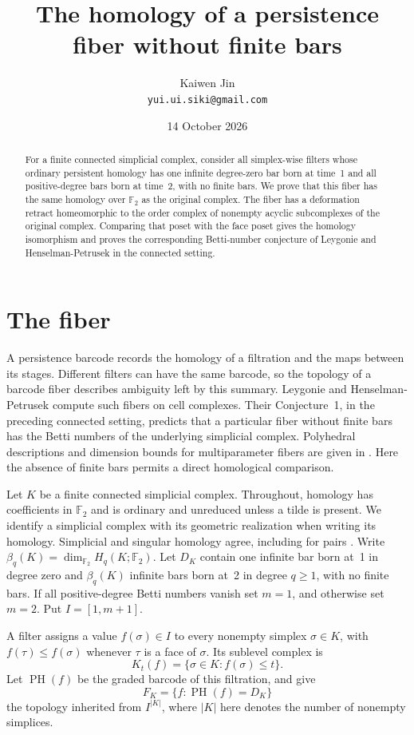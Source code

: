 \documentclass[11pt,a4paper]{article}
\title{The homology of a persistence fiber without finite bars}
\author{Kaiwen Jin\\[2pt]\small\texttt{yui.ui.siki@gmail.com}}
\date{14 October 2026}
\newcommand{\F}{\mathbb F_2}
\newcommand{\PH}{\operatorname{PH}}
\begin{document}
\maketitle
\begin{abstract}
For a finite connected simplicial complex, consider all simplex-wise filters
whose ordinary persistent homology has one infinite degree-zero bar born at
time~1 and all positive-degree bars born at time~2, with no finite bars.
We prove that this fiber has the same homology over $\F$ as the original
complex. The fiber has a deformation retract homeomorphic to the order
complex of nonempty acyclic subcomplexes of the original complex.
Comparing that poset with the face poset gives the homology
isomorphism and proves the corresponding Betti-number conjecture of
Leygonie and Henselman-Petrusek in the connected setting.
\end{abstract}

\section{The fiber}

A persistence barcode records the homology of a filtration and the maps
between its stages. Different filters can have the same barcode, so the
topology of a barcode fiber describes ambiguity left by this summary.
Leygonie and Henselman-Petrusek \cite{LH} compute such fibers on cell
complexes. Their Conjecture~1, in the preceding connected setting, predicts
that a particular fiber without finite bars has the Betti numbers of the
underlying simplicial complex. Polyhedral descriptions and dimension bounds
for multiparameter fibers are given in \cite[Theorem~5.3 and
Proposition~5.9]{HTT}. Here the absence of finite bars permits a direct
homological comparison.

Let $K$ be a finite connected simplicial complex. Throughout, homology has
coefficients in $\F$ and is ordinary and unreduced unless a tilde is present.
We identify a simplicial complex with its geometric realization when writing
its homology. Simplicial and singular homology agree, including for pairs
\cite[Theorem~2.27 and p.~153]{Hatcher}.
Write $\beta_q(K)=\dim_{\F}H_q(K;\F)$.
Let $D_K$ contain one infinite bar born at~1 in degree zero and
$\beta_q(K)$ infinite bars born at~2 in degree $q\geq1$, with no finite bars.
If all positive-degree Betti numbers vanish set $m=1$, and otherwise set
$m=2$. Put $I=[1,m+1]$.

A filter assigns a value $f(\sigma)\in I$ to every nonempty simplex
$\sigma\in K$, with $f(\tau)\leq f(\sigma)$ whenever $\tau$ is a face of
$\sigma$. Its sublevel complex is
\[
 K_t(f)=\{\sigma\in K:f(\sigma)\leq t\}.
\]
Let $\PH(f)$ be the graded barcode of this filtration, and give
\[
 F_K=\{f:\PH(f)=D_K\}
\]
the topology inherited from $I^{|K|}$, where $|K|$ here denotes the number of
nonempty simplices.
\end{document}
